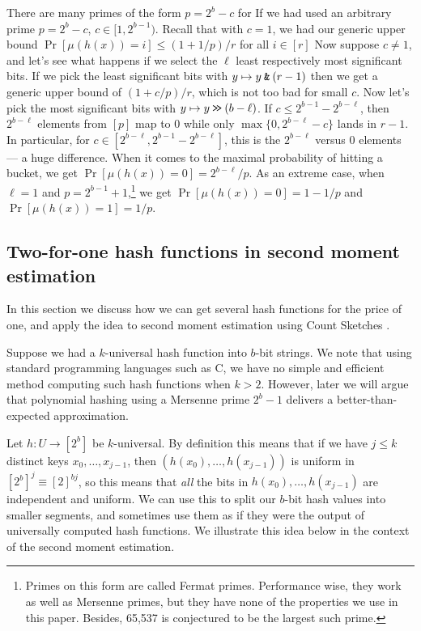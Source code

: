 \vspace{.5em}

There are many primes of the form $p=2^b-c$ for 
      If we had used an  arbitrary prime $p=2^b-c$, $c\in [1,2^{b-1})$.
Recall that with $c=1$, we had our generic upper bound
$\Pr[\mu(h(x))=i]\leq (1+1/p)/r$ for all $i\in[r]$
Now suppose $c\neq 1$, and let's see what happens if we select
the $\ell$ least respectively most significant bits. If
we pick the least significant bits with $y\mapsto y\mathbin{\texttt{\&}}(r-1)$
then we get a generic upper bound of $(1+c/p)/r$, which is not
too bad for small $c$.
Now let's pick the most significant bits with $y\mapsto y\mathbin{\texttt{>\!>}} (b-\ell)$.
If $c\leq 2^{b-1}-2^{b-\ell}$, then $2^{b-\ell}$ elements from
$[p]$ map to $0$ while only $\max\{0,2^{b-\ell}-c\}$
lands in $r-1$. In particular, for $c\in [2^{b-\ell}, 2^{b-1}-2^{b-\ell}]$,
this is the $2^{b-\ell}$ versus $0$ elements --- a huge difference.
When it comes to the maximal probability of hitting a bucket,
we get $\Pr[\mu(h(x))=0]=2^{b-\ell}/p$.
As an extreme case, when $\ell=1$ and $p=2^{b-1}+1$,\footnote{Primes on this form are called Fermat primes.
   Performance wise, they work as well as Mersenne primes, but they have none of the properties we use in this paper.
Besides, 65,537 is conjectured to be the largest such prime.}
we get $\Pr[\mu(h(x))=0]=1-1/p$ and $\Pr[\mu(h(x))=1]=1/p$.

\subsection{Two-for-one hash functions in second moment estimation}
In this section we discuss how we can get several hash functions for
the price of one, and apply the idea to second moment estimation using
Count Sketches \cite{charikar04count-sketch}.

Suppose we had a $k$-universal hash function into $b$-bit strings.
We note that using standard programming languages such as C, we have
no simple and efficient method computing such hash
functions when $k>2$. However, later we will argue that polynomial
hashing using a Mersenne prime $2^b-1$ delivers a better-than-expected
approximation.

Let $h:U\to [2^b]$ be $k$-universal. By definition this
means that if we have $j\leq k$ distinct keys $x_0,\ldots,x_{j - 1}$, then
$(h(x_0),\ldots,h(x_{j - 1}))$ is uniform in $[2^b]^j\equiv [2]^{bj}$,
so this means that \emph{all} the bits in $h(x_0),\ldots,h(x_{j - 1})$ are
independent and uniform. We can use this to split our $b$-bit hash
values into smaller segments, and sometimes use them as if
they were the output of universally computed hash functions.
We illustrate this idea below in the context of the second moment estimation.

